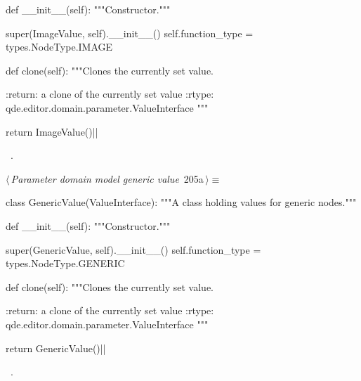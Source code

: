 \documentclass[%
    a4paper,    %
    justified,  %
    nobib,      %
    openany     %
]{tufte-book}
\makeatletter
\renewcommand{\label}[1]{\@tufte@label{##1}}%
\makeatother
\begin{document}
\begin{fullwidth}
\begin{flushleft}
\begin{minipage}{\linewidth}
\begin{pythoncode}
    def __init__(self):
        """Constructor."""

        super(ImageValue, self).__init__()
        self.function_type = types.NodeType.IMAGE

    def clone(self):
        """Clones the currently set value.

        :return: a clone of the currently set value
        :rtype:  qde.editor.domain.parameter.ValueInterface
        """

        return ImageValue()|\NWsep|
\end{pythoncode}
\vspace{1.5ex}
\footnotesize
\begin{list}{}{\setlength{\itemsep}{-\parsep}\setlength{\itemindent}{-\leftmargin}}
\item \NWtxtMacroRefIn\ .

\item{}
\end{list}
\end{minipage}\vspace{4ex}
\end{flushleft}
\begin{flushleft} \small
\begin{minipage}{\linewidth}\label{scrap199}\raggedright\small
{} $\langle\,${\itshape Parameter domain model generic value}\nobreak\ {\footnotesize {205a}}$\,\rangle\equiv$
\vspace{-1ex}
\begin{pythoncode}
class GenericValue(ValueInterface):
    """A class holding values for generic nodes."""

    def __init__(self):
        """Constructor."""

        super(GenericValue, self).__init__()
        self.function_type = types.NodeType.GENERIC

    def clone(self):
        """Clones the currently set value.

        :return: a clone of the currently set value
        :rtype:  qde.editor.domain.parameter.ValueInterface
        """

        return GenericValue()|\NWsep|
\end{pythoncode}
\vspace{1.5ex}
\footnotesize
\begin{list}{}{\setlength{\itemsep}{-\parsep}\setlength{\itemindent}{-\leftmargin}}
\item \NWtxtMacroRefIn\ .


\end{list}
\end{minipage}
\end{flushleft}
\end{fullwidth}
\end{document}
